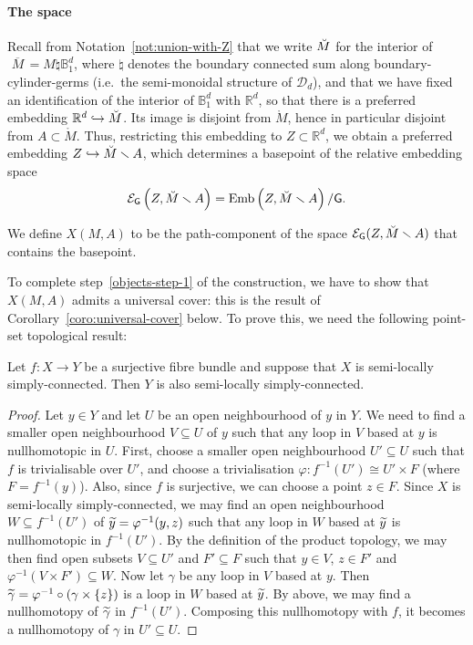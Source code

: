 \documentclass[AHL,Unicode,published]{cedram}
\newcommand{\Emb}{\mathrm{Emb}}
\newcommand{\Int}{\mathring}
\newcommand{\mbar}{\ensuremath{{\,\,\overline{\!\! M\!}\,}}}
\newcommand{\sG}{\mathsf{G}}
\newcommand{\cD}{\mathcal{D}}
\newcommand{\cE}{\mathcal{E}}
\newcommand{\bB}{\mathbb{B}}
\newcommand{\bR}{\mathbb{R}}
\let\oldtilde\tilde
\renewcommand*{\tilde}[1]{\mathchoice{\widetilde{#1}}{\widetilde{#1}}{\oldtilde{#1}}{\oldtilde{#1}}}
\begin{document}
\paragraph*{The space}

Recall from Notation~\ref{not:union-with-Z} that we write $\Breve{M}$ for the interior of $\mbar = M \natural \bB_{1}^d$, where $\natural$ denotes the boundary connected sum along boundary-cylinder-germs (i.e.~the semi-monoidal structure of $\cD_{d}$), and that we have fixed an identification of the interior of $\bB_{1}^d$ with $\bR^d$, so that there is a preferred embedding $\bR^d \hookrightarrow \Breve{M}$. Its image is disjoint from $\Int{M}$, hence in particular disjoint from $A \subset \Int{M}$. Thus, restricting this embedding to $Z \subset \bR^d$, we obtain a preferred embedding $Z \hookrightarrow \Breve{M} \smallsetminus A$, which determines a basepoint of the relative embedding space
\[
\cE_{\sG}\left(Z, \Breve{M} \smallsetminus A\right) = \Emb\left(Z, \Breve{M} \smallsetminus A\right) / \sG.
\]

\begin{defi}\label{def:space_X_M_A}
We define $X(M,A)$ to be the path-component of the space $\cE_{\sG}(Z, \Breve{M} \smallsetminus A)$ that contains the basepoint.
\end{defi}

To complete step~\eqref{objects-step-1} of the construction, we have to show that $X(M,A)$ admits a universal cover: this is the result of Corollary~\ref{coro:universal-cover} below. To prove this, we need the following point-set topological result:

\begin{lemm}\label{lem:semi-locally-1-connected}
Let $f \colon X \to Y$ be a surjective fibre bundle and suppose that $X$ is semi-locally simply-connected. Then $Y$ is also semi-locally simply-connected.
\end{lemm}


\begin{proof}
Let $y \in Y$ and let $U$ be an open neighbourhood of $y$ in $Y$. We need to find a smaller open neighbourhood $V \subseteq U$ of $y$ such that any loop in $V$ based at $y$ is nullhomotopic in $U$. First, choose a smaller open neighbourhood $U' \subseteq U$ such that $f$ is trivialisable over $U'$, and choose a trivialisation $\varphi \colon f^{-1}(U') \cong U' \times F$ (where $F = f^{-1}(y)$). Also, since $f$ is surjective, we can choose a point $z \in F$. Since $X$ is semi-locally simply-connected, we may find an open neighbourhood $W \subseteq f^{-1}(U')$ of $\tilde{y} = \varphi^{-1}(y,z)$ such that any loop in $W$ based at $\tilde{y}$ is nullhomotopic in $f^{-1}(U')$. By the definition of the product topology, we may then find open subsets $V \subseteq U'$ and $F' \subseteq F$ such that $y \in V$, $z \in F'$ and $\varphi^{-1}(V \times F') \subseteq W$. Now let $\gamma$ be any loop in $V$ based at $y$. Then $\tilde{\gamma} = \varphi^{-1} \circ (\gamma \times \{z\})$ is a loop in $W$ based at $\tilde{y}$. By above, we may find a nullhomotopy of $\tilde{\gamma}$ in $f^{-1}(U')$. Composing this nullhomotopy with $f$, it becomes a nullhomotopy of $\gamma$ in $U' \subseteq U$.
\end{proof}
\end{document}
